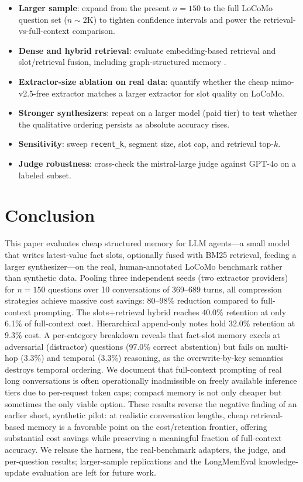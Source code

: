 \documentclass[conference]{IEEEtran}
\begin{document}
\begin{itemize}
    \item \textbf{Larger sample}: expand from the present $n=150$ to the full LoCoMo question set ($n\sim$2K) to tighten confidence intervals and power the retrieval-vs-full-context comparison.
    \item \textbf{Dense and hybrid retrieval}: evaluate embedding-based retrieval and slot/retrieval fusion, including graph-structured memory \cite{xu2025amem, chhikara2025mem0}.
    \item \textbf{Extractor-size ablation on real data}: quantify whether the cheap mimo-v2.5-free extractor matches a larger extractor for slot quality on LoCoMo.
    \item \textbf{Stronger synthesizers}: repeat on a larger model (paid tier) to test whether the qualitative ordering persists as absolute accuracy rises.
    \item \textbf{Sensitivity}: sweep \texttt{recent\_k}, segment size, slot cap, and retrieval top-$k$.
    \item \textbf{Judge robustness}: cross-check the mistral-large judge against GPT-4o on a labeled subset.
\end{itemize}

\section{Conclusion}

This paper evaluates cheap structured memory for LLM agents---a small model that writes latest-value fact slots, optionally fused with BM25 retrieval, feeding a larger synthesizer---on the real, human-annotated LoCoMo benchmark rather than synthetic data. Pooling three independent seeds (two extractor providers) for $n=150$ questions over 10 conversations of 369--689 turns, all compression strategies achieve massive cost savings: 80--98\% reduction compared to full-context prompting. The slots+retrieval hybrid reaches 40.0\% retention at only 6.1\% of full-context cost. Hierarchical append-only notes hold 32.0\% retention at 9.3\% cost. A per-category breakdown reveals that fact-slot memory excels at adversarial (distractor) questions (97.0\% correct abstention) but fails on multi-hop (3.3\%) and temporal (3.3\%) reasoning, as the overwrite-by-key semantics destroys temporal ordering. We document that full-context prompting of real long conversations is often operationally inadmissible on freely available inference tiers due to per-request token caps; compact memory is not only cheaper but sometimes the only viable option. These results reverse the negative finding of an earlier short, synthetic pilot: at realistic conversation lengths, cheap retrieval-based memory is a favorable point on the cost/retention frontier, offering substantial cost savings while preserving a meaningful fraction of full-context accuracy. We release the harness, the real-benchmark adapters, the judge, and per-question results; larger-sample replications and the LongMemEval knowledge-update evaluation are left for future work.
\end{document}
